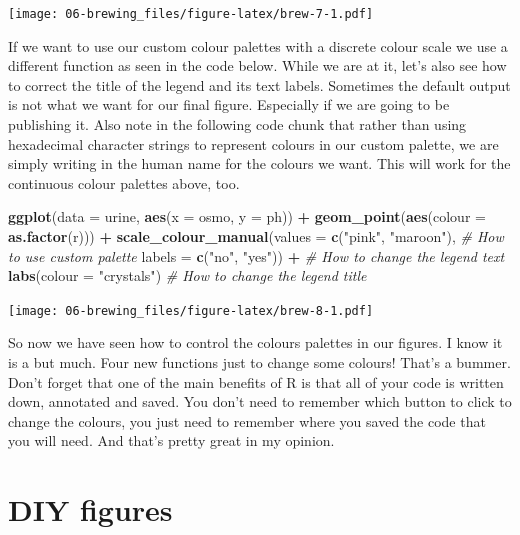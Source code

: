 \documentclass[]{book}
\newenvironment{Shaded}{\begin{snugshade}}{\end{snugshade}}
\newcommand{\KeywordTok}[1]{\textcolor[rgb]{0.13,0.29,0.53}{\textbf{#1}}}
\newcommand{\DataTypeTok}[1]{\textcolor[rgb]{0.13,0.29,0.53}{#1}}
\newcommand{\StringTok}[1]{\textcolor[rgb]{0.31,0.60,0.02}{#1}}
\newcommand{\CommentTok}[1]{\textcolor[rgb]{0.56,0.35,0.01}{\textit{#1}}}
\newcommand{\OperatorTok}[1]{\textcolor[rgb]{0.81,0.36,0.00}{\textbf{#1}}}
\newcommand{\NormalTok}[1]{#1}
\theoremstyle{definition}
\theoremstyle{definition}
\theoremstyle{definition}
\theoremstyle{remark}
\begin{document}
\texttt{[image: 06-brewing\_files/figure-latex/brew-7-1.pdf]}

If we want to use our custom colour palettes with a discrete colour
scale we use a different function as seen in the code below. While we
are at it, let's also see how to correct the title of the legend and its
text labels. Sometimes the default output is not what we want for our
final figure. Especially if we are going to be publishing it. Also note
in the following code chunk that rather than using hexadecimal character
strings to represent colours in our custom palette, we are simply
writing in the human name for the colours we want. This will work for
the continuous colour palettes above, too.

\begin{Shaded}
\begin{Highlighting}[]
\KeywordTok{ggplot}\NormalTok{(}\DataTypeTok{data =}\NormalTok{ urine, }\KeywordTok{aes}\NormalTok{(}\DataTypeTok{x =}\NormalTok{ osmo, }\DataTypeTok{y =}\NormalTok{ ph)) }\OperatorTok{+}
\StringTok{  }\KeywordTok{geom_point}\NormalTok{(}\KeywordTok{aes}\NormalTok{(}\DataTypeTok{colour =} \KeywordTok{as.factor}\NormalTok{(r))) }\OperatorTok{+}
\StringTok{  }\KeywordTok{scale_colour_manual}\NormalTok{(}\DataTypeTok{values =} \KeywordTok{c}\NormalTok{(}\StringTok{"pink"}\NormalTok{, }\StringTok{"maroon"}\NormalTok{), }\CommentTok{# How to use custom palette}
                     \DataTypeTok{labels =} \KeywordTok{c}\NormalTok{(}\StringTok{"no"}\NormalTok{, }\StringTok{"yes"}\NormalTok{)) }\OperatorTok{+}\StringTok{ }\CommentTok{# How to change the legend text}
\StringTok{  }\KeywordTok{labs}\NormalTok{(}\DataTypeTok{colour =} \StringTok{"crystals"}\NormalTok{) }\CommentTok{# How to change the legend title}
\end{Highlighting}
\end{Shaded}

\texttt{[image: 06-brewing\_files/figure-latex/brew-8-1.pdf]}

So now we have seen how to control the colours palettes in our figures.
I know it is a but much. Four new functions just to change some colours!
That's a bummer. Don't forget that one of the main benefits of R is that
all of your code is written down, annotated and saved. You don't need to
remember which button to click to change the colours, you just need to
remember where you saved the code that you will need. And that's pretty
great in my opinion.

\section{DIY figures}\label{diy-figures}
\end{document}
